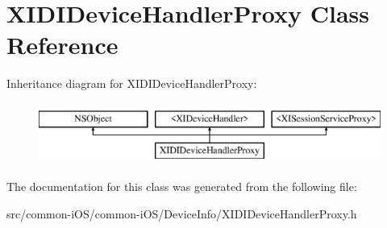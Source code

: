 \hypertarget{interface_x_i_d_i_device_handler_proxy}{}\section{X\+I\+D\+I\+Device\+Handler\+Proxy Class Reference}
\label{interface_x_i_d_i_device_handler_proxy}
Inheritance diagram for X\+I\+D\+I\+Device\+Handler\+Proxy\+:\begin{figure}[H]
\begin{center}
\leavevmode
\includegraphics[height=2.000000cm]{interface_x_i_d_i_device_handler_proxy}
\end{center}
\end{figure}


The documentation for this class was generated from the following file\+:\begin{DoxyCompactItemize}
\item 
src/common-\/i\+O\+S/common-\/i\+O\+S/\+Device\+Info/X\+I\+D\+I\+Device\+Handler\+Proxy.\+h\end{DoxyCompactItemize}
